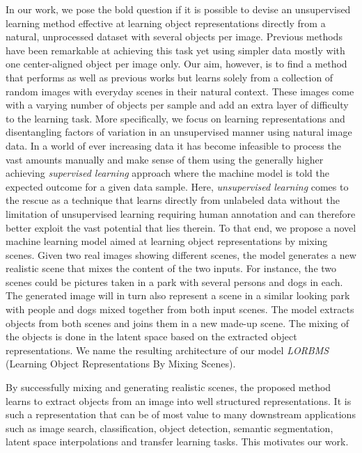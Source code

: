 \documentclass[12pt,a4paper]{article}
\begin{document}
In our work, we pose the bold question if it is possible to devise an unsupervised learning method effective at learning object representations directly from a natural, unprocessed dataset with several objects per image. Previous methods have been remarkable at achieving this task yet using simpler data mostly with one center-aligned object per image only. Our aim, however, is to find a method that performs as well as previous works but learns solely from a collection of random images with everyday scenes in their natural context. These images come with a varying number of objects per sample and add an extra layer of difficulty to the learning task. More specifically, we focus on learning representations and disentangling factors of variation in an unsupervised manner using natural image data. In a world of ever increasing data it has become infeasible to process the vast amounts manually and make sense of them using the generally higher achieving \textit{supervised learning} approach where the machine model is told the expected outcome for a given data sample. Here, \textit{unsupervised learning} comes to the rescue as a technique that learns directly from unlabeled data without the limitation of unsupervised learning requiring human annotation and can therefore better exploit the vast potential that lies therein. To that end, we propose a novel machine learning model aimed at learning object representations by mixing scenes. Given two real images showing different scenes, the model generates a new realistic scene that mixes the content of the two inputs. For instance, the two scenes could be pictures taken in a park with several persons and dogs in each. The generated image will in turn also represent a scene in a similar looking park with people and dogs mixed together from both input scenes. The model extracts objects from both scenes and joins them in a new made-up scene. The mixing of the objects is done in the latent space based on the extracted object representations. We name the resulting architecture of our model \textit{LORBMS} (Learning Object Representations By Mixing Scenes).

By successfully mixing and generating realistic scenes, the proposed method learns to extract objects from an image into well structured representations. It is such a representation that can be of most value to many downstream applications such as image search, classification, object detection, semantic segmentation, latent space interpolations and transfer learning tasks. This motivates our work.
\end{document}
